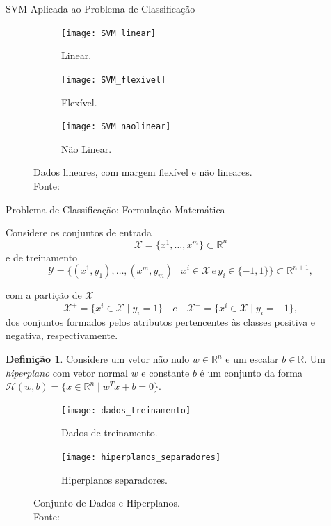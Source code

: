 \documentclass{beamer}
\def\Xset{\mathcal{X}}
\def\Yset{\mathcal{Y}}
\def\Hset{\mathcal{H}}
\def\RR{\mathds{R}}
\theoremstyle{definition}%
\newtheorem{defi}{Definição}
\begin{document}
\begin{frame}{SVM Aplicada ao Problema de Classificação}

\begin{figure}[!h] 
	\centering
	\begin{subfigure}[h]{0.3\textwidth}
		\centering
		\texttt{[image: SVM\_linear]}
		\caption{Linear. \label{fig1:a}}
	\end{subfigure}
	\begin{subfigure}[!h]{0.3\textwidth}
		\centering
		\texttt{[image: SVM\_flexivel]}
		\caption{Flexível. \label{fig1:b}}
	\end{subfigure}
	\begin{subfigure}[!h]{0.3\textwidth}
		\centering
		\texttt{[image: SVM\_naolinear]}
		\caption{Não Linear. \label{fig1:c}}
	\end{subfigure}
	\caption{Dados lineares, com margem flexível e não lineares. \label{fig1}\\ Fonte: \textcite{Evelin2017}}
\end{figure}
\end{frame}


\begin{frame}{Problema de Classificação: Formulação Matemática}
\begin{block}{}
Considere os conjuntos de entrada 
\[\Xset =\{x^1, \ldots , x^m \} \subset \RR^n \] 
e de treinamento 
\[\Yset=\{(x^1, y_1), \ldots , (x^m, y_m)\mid x^i \in \Xset \, e \, y_i \in \{-1,1\}\}  \subset \RR^{n+1},\]

com a partição de $\Xset$
\[ \label{conj1}
\Xset ^{+} =\{x^i \in \Xset\mid y_i=1\} \quad e \quad \Xset^{-}=\{x^i \in \Xset\mid y_i=-1\},
\]
dos conjuntos formados pelos atributos pertencentes às classes positiva e negativa, respectivamente.
\end{block}
\end{frame}


\begin{frame}

\begin{defi} 
Considere um vetor não nulo $w\in \RR^n$ e um escalar $b\in \RR$. Um \emph{hiperplano} com vetor normal $w$ e constante $b$ é um conjunto da forma $\Hset(w,b)=\{x\in \RR^n \mid w^{T}x+b=0\}$.
\end{defi}
\pause
\begin{figure}[h] 
	\centering
	\begin{subfigure}[h]{0.36\textwidth}
		\centering
		\texttt{[image: dados\_treinamento]}
		\caption{Dados de treinamento. \label{fig2:a}}
	\end{subfigure}
	\begin{subfigure}[h]{0.34\textwidth}
		\centering
		\texttt{[image: hiperplanos\_separadores]}
		\caption{Hiperplanos separadores. \label{fig2:b}}
	\end{subfigure}
	\caption{Conjunto de Dados e Hiperplanos. \label{fig2}
		\\ Fonte: \textcite{Evelin2017}}
\end{figure}
\end{frame}
\end{document}
